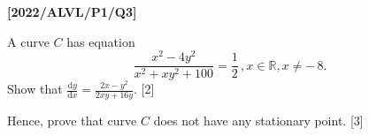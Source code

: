 \item \textbf{{[}2022/ALVL/P1/Q3{]}}

A curve $C$ has equation 
\[
\frac{x^{2}-4y^{2}}{x^{2}+xy^{2}+100}=\frac{1}{2}\,,x\in\mathbb{R},x\ne-\,8.
\]
Show that $\frac{\text{d}y}{\text{d}x}=\frac{2x-y^{2}}{2xy+16y}$.
\hfill{}{[}2{]}

Hence, prove that curve $C$ does not have any stationary point. \hfill{}{[}3{]}
